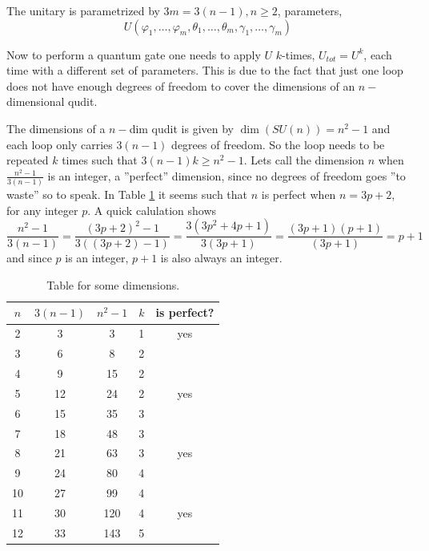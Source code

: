 The unitary is parametrized by $3m = 3(n-1), n\geq 2$, parameters,
\begin{equation}
U(\varphi_1,\dots,\varphi_m,\theta_1,\dots,\theta_m,\gamma_1,\dots,\gamma_m) 
\end{equation} 


Now to perform a quantum gate one needs to apply $U$ $k$-times, $U_{tot} = U^k$, each time with a different set of parameters. This is due to the fact that just one loop does not have enough degrees of freedom to cover the dimensions of an $n-$dimensional qudit.

The dimensions of a $n-$dim qudit is given by $\dim(SU(n)) = n^2 -1$ and each loop only carries $3(n-1)$ degrees of freedom. So the loop needs to be repeated $k$ times such that $3(n-1)k \geq n^2 -1$.
Lets call the dimension $n$ when $\frac{n^2-1}{3(n-1)}$ is an integer, a ''perfect'' dimension, since no degrees of freedom goes ''to waste'' so to speak. In Table \ref{tab:dim} it seems such that $n$ is perfect when $n = 3p + 2$, for any integer $p$.
A quick calulation shows
\begin{equation}
\frac{n^2 -1}{3(n-1)} = \frac{(3p+2)^2-1}{3((3p+2)-1)} = \frac{3(3p^2 + 4p + 1)}{3(3p+1)} = \frac{(3p + 1)(p + 1)}{(3p +1)} = p + 1
\end{equation}
and since $p$ is an integer, $p + 1$ is also always an integer.\\
\begin{table}[H]
\centering 
\begin{tabular}{|c|c|c|c|c|}
\hline
$n$ & $3(n-1)$ & $n^2 - 1$ & $k$ & is perfect?\\
\hline
2& 3& 3& 1& yes\\
3& 6& 8& 2& \\
4& 9& 15& 2& \\
5& 12& 24& 2& yes \\
6& 15& 35& 3& \\
7& 18& 48& 3& \\
8& 21& 63& 3& yes \\
9& 24& 80& 4& \\
10& 27& 99& 4& \\
11& 30& 120& 4& yes \\
12& 33& 143& 5& \\
\hline
\end{tabular}
\caption{Table for some dimensions.}
\label{tab:dim}
\end{table}

